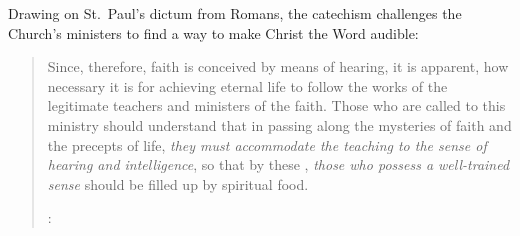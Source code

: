 Drawing on St.\ Paul's dictum from Romans, the catechism challenges the Church's ministers to find a way to make Christ the Word audible:
\begin{quote}
Since, therefore, faith is conceived by means of hearing, it is apparent, how necessary it is for achieving eternal life to follow the works of the legitimate teachers and ministers of the faith. \Dots{}
Those who are called to this ministry should understand that in passing along the mysteries of faith and the precepts of life, \emph{they must accommodate the teaching to the sense of hearing and intelligence}, so that by these , \emph{those who possess a well-trained sense} should be filled up by spiritual food.%
  \begin{Footnote}
  \Autocite[2, 8--9 (emphasis added)]{Catholic:Catechismus1614}: 
  \end{Footnote}
\end{quote}

